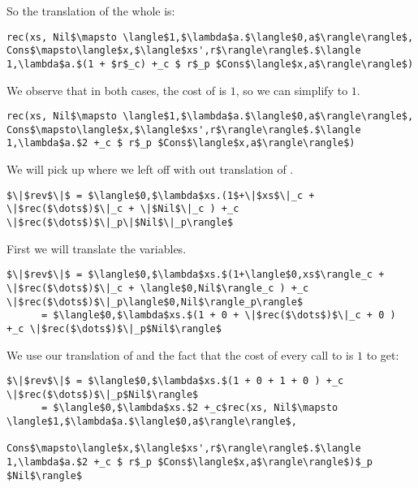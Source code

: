 %
So the translation of the whole  is:
%
\begin{lstlisting}
rec(xs, Nil$\mapsto \langle$1,$\lambda$a.$\langle$0,a$\rangle\rangle$, Cons$\mapsto\langle$x,$\langle$xs',r$\rangle\rangle$.$\langle 1,\lambda$a.$(1 + $r$_c) +_c $ r$_p $Cons$\langle$x,a$\rangle\rangle$)
\end{lstlisting}
%
We observe that in both cases, the cost of  is $1$, so we can simplify  to $1$.
%
\begin{lstlisting}
rec(xs, Nil$\mapsto \langle$1,$\lambda$a.$\langle$0,a$\rangle\rangle$, Cons$\mapsto\langle$x,$\langle$xs',r$\rangle\rangle$.$\langle 1,\lambda$a.$2 +_c $ r$_p $Cons$\langle$x,a$\rangle\rangle$)
\end{lstlisting}
%

We will pick up where we left off with out translation of .
%
\begin{lstlisting}
$\|$rev$\|$ = $\langle$0,$\lambda$xs.(1$+\|$xs$\|_c + \|$rec($\dots$)$\|_c + \|$Nil$\|_c ) +_c \|$rec($\dots$)$\|_p\|$Nil$\|_p\rangle$
\end{lstlisting}
%
First we will translate the variables.
%
\begin{lstlisting}
$\|$rev$\|$ = $\langle$0,$\lambda$xs.$(1+\langle$0,xs$\rangle_c + \|$rec($\dots$)$\|_c + \langle$0,Nil$\rangle_c ) +_c \|$rec($\dots$)$\|_p\langle$0,Nil$\rangle_p\rangle$
      = $\langle$0,$\lambda$xs.$(1 + 0 + \|$rec($\dots$)$\|_c + 0 ) +_c \|$rec($\dots$)$\|_p$Nil$\rangle$
\end{lstlisting}
%
We use our translation of  and the fact that the cost of every call to  is $1$ to get:
%
\begin{lstlisting}
$\|$rev$\|$ = $\langle$0,$\lambda$xs.$(1 + 0 + 1 + 0 ) +_c \|$rec($\dots$)$\|_p$Nil$\rangle$
      = $\langle$0,$\lambda$xs.$2 +_c$rec(xs, Nil$\mapsto \langle$1,$\lambda$a.$\langle$0,a$\rangle\rangle$,
                      Cons$\mapsto\langle$x,$\langle$xs',r$\rangle\rangle$.$\langle 1,\lambda$a.$2 +_c $ r$_p $Cons$\langle$x,a$\rangle\rangle$)$_p $Nil$\rangle$
\end{lstlisting}
%

